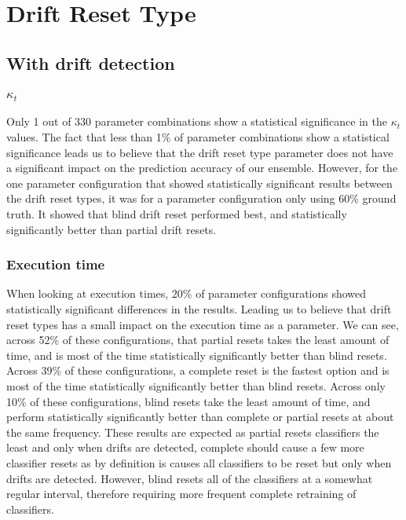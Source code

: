 \section{Drift Reset Type}
\subsection{With drift detection}
\subsubsection{$\kappa_t$}
Only 1 out of 330 parameter combinations show a statistical significance in the $\kappa_t$ values. The fact that less than 1\% of parameter combinations show a statistical significance leads us to believe that the drift reset type parameter does not have a significant impact on the prediction accuracy of our ensemble. However, for the one parameter configuration that showed statistically significant results between the drift reset types, it was for a parameter configuration only using 60\% ground truth. It showed that blind drift reset performed best, and statistically significantly better than partial drift resets.

\subsubsection{Execution time}
When looking at execution times, 20\% of parameter configurations showed statistically significant differences in the results. Leading us to believe that drift reset types has a small impact on the execution time as a parameter. We can see, across 52\% of these configurations, that partial resets takes the least amount of time, and is most of the time statistically significantly better than blind resets. Across 39\% of these configurations, a complete reset is the fastest option and is most of the time statistically significantly better than blind resets. Across only 10\% of these configurations, blind resets take the least amount of time, and perform statistically significantly better than complete or partial resets at about the same frequency.
These results are expected as partial resets classifiers the least and only when drifts are detected, complete should cause a few more classifier resets as by definition is causes all classifiers to be reset but only when drifts are detected. However, blind resets all of the classifiers at a somewhat regular interval, therefore requiring more frequent complete retraining of classifiers.


